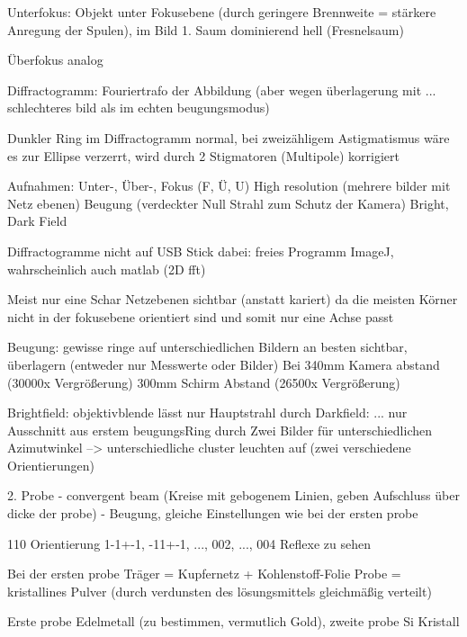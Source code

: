 
Unterfokus: Objekt unter Fokusebene (durch geringere Brennweite = stärkere Anregung der Spulen), im Bild 1. Saum dominierend hell (Fresnelsaum)

Überfokus analog

Diffractogramm: Fouriertrafo der Abbildung (aber wegen überlagerung mit ... schlechteres bild als im echten beugungsmodus)

Dunkler Ring im Diffractogramm normal, bei zweizähligem Astigmatismus wäre es zur Ellipse verzerrt, wird durch 2 Stigmatoren (Multipole) korrigiert


Aufnahmen:
Unter-, Über-, Fokus (F, Ü, U)
High resolution (mehrere bilder mit Netz ebenen)
Beugung (verdeckter Null Strahl zum Schutz der Kamera)
Bright, Dark Field

Diffractogramme nicht auf USB Stick dabei: freies Programm ImageJ, wahrscheinlich auch matlab (2D fft)

Meist nur eine Schar Netzebenen sichtbar (anstatt kariert) da die meisten Körner nicht in der fokusebene orientiert sind und somit nur eine Achse passt


Beugung: gewisse ringe auf unterschiedlichen Bildern an besten sichtbar, überlagern (entweder nur Messwerte oder Bilder)
Bei 340mm Kamera abstand (30000x Vergrößerung)
300mm Schirm Abstand (26500x Vergrößerung)

Brightfield: objektivblende lässt nur Hauptstrahl durch
Darkfield: ... nur Ausschnitt aus erstem beugungsRing durch
Zwei Bilder für unterschiedlichen Azimutwinkel --> unterschiedliche cluster leuchten auf (zwei verschiedene Orientierungen)




2. Probe
- convergent beam (Kreise mit gebogenem Linien, geben Aufschluss über dicke der probe)
- Beugung, gleiche Einstellungen wie bei der ersten probe

110 Orientierung
1-1+-1, -11+-1, ..., 002, ..., 004 Reflexe zu sehen



Bei der ersten probe
Träger = Kupfernetz + Kohlenstoff-Folie
Probe = kristallines Pulver (durch verdunsten des lösungsmittels gleichmäßig verteilt)

Erste probe Edelmetall (zu bestimmen, vermutlich Gold), zweite probe Si Kristall



